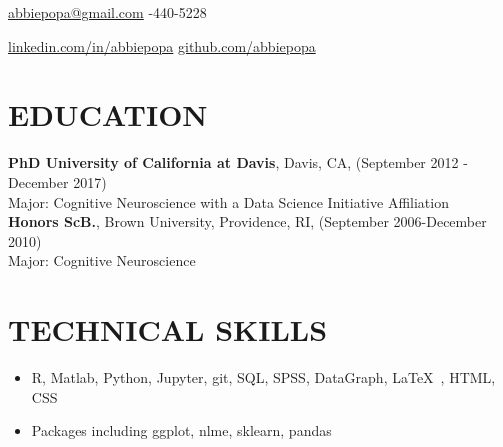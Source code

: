 \documentclass[line,margin,10pt]{res}
\begin{document}
 
\begin{resume}
\hoffset\centerline 
{\hyperref[abbiepopa@gmail.com]{abbiepopa@gmail.com} \quad \quad \quad \quad  \quad \quad \quad \quad \quad \quad \quad \quad \quad \quad \quad \quad \quad \quad \quad \quad \quad\quad \quad \quad \quad \quad \quad \quad \quad \quad \quad \quad  \quad \quad {}-440-5228}
\hoffset\centerline 
{\hspace{0.05cm} \hyperref[linkedin.com/in/abbiepopa]{linkedin.com/in/abbiepopa} \quad \quad \quad \quad \quad \quad \quad \quad \quad \quad \quad\quad \quad \quad \quad \quad \quad \quad \quad \quad \quad \quad  \quad \quad \quad  \quad \quad \quad   \quad \hyperref[github.com/abbiepopa]{github.com/abbiepopa}}
 
\section{EDUCATION} 
\textbf{PhD University of California at Davis}, Davis, CA, (September 2012 - December 2017)\\
Major: Cognitive Neuroscience with a Data Science Initiative Affiliation\\
\textbf{Honors ScB.}, Brown University, Providence, RI, (September 2006-December 2010)\\
                Major: Cognitive Neuroscience
                
 \section{TECHNICAL SKILLS} 
 \begin{itemize}[leftmargin=-2pt] \itemsep -2pt
\item [] R, Matlab, Python, Jupyter, git, SQL, SPSS, DataGraph, \LaTeX\ , HTML, CSS
\item []Packages including ggplot, nlme, sklearn, pandas
 \end{itemize}
								

\end{resume}
\end{document}
